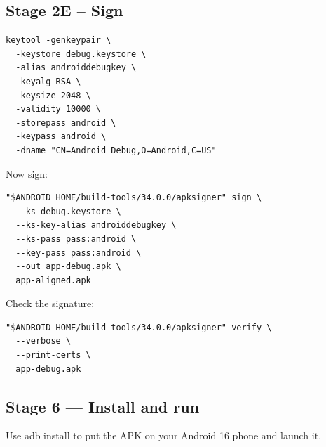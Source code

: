 \documentclass[11pt]{article}
\begin{document}
\subsection{Stage 2E -- Sign}
\label{sec:org1c42c1e}
\begin{verbatim}
keytool -genkeypair \
  -keystore debug.keystore \
  -alias androiddebugkey \
  -keyalg RSA \
  -keysize 2048 \
  -validity 10000 \
  -storepass android \
  -keypass android \
  -dname "CN=Android Debug,O=Android,C=US"
\end{verbatim}

Now sign:

\begin{verbatim}
"$ANDROID_HOME/build-tools/34.0.0/apksigner" sign \
  --ks debug.keystore \
  --ks-key-alias androiddebugkey \
  --ks-pass pass:android \
  --key-pass pass:android \
  --out app-debug.apk \
  app-aligned.apk
\end{verbatim}

Check the signature:
\begin{verbatim}
"$ANDROID_HOME/build-tools/34.0.0/apksigner" verify \
  --verbose \
  --print-certs \
  app-debug.apk
\end{verbatim}
\subsection{Stage 6 — Install and run}
\label{sec:org37fef17}

Use adb install to put the APK on your Android 16 phone and launch it.
\end{document}
